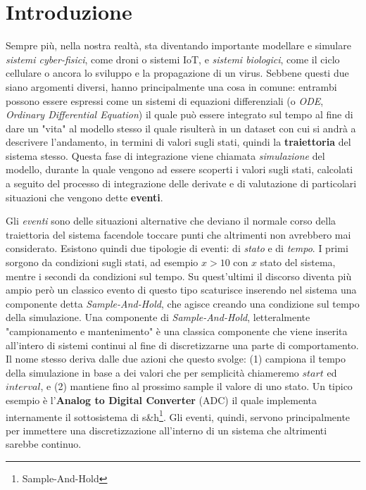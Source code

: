 \chapter{Introduzione}
Sempre più, nella nostra realtà, sta diventando importante modellare e simulare \textit{sistemi cyber-fisici}, come droni o sistemi IoT, e \textit{sistemi biologici}, come il ciclo cellulare o ancora lo sviluppo e la propagazione di un virus. Sebbene questi due siano argomenti diversi, hanno principalmente una cosa in comune: entrambi possono essere espressi come un sistemi di equazioni differenziali (o \textit{ODE}, \textit{Ordinary Differential Equation}) il quale può essere integrato sul tempo al fine di dare un "vita" al modello stesso il quale risulterà in un dataset con cui si andrà a descrivere l'andamento, in termini di valori sugli stati, quindi la \textbf{traiettoria} del sistema stesso. Questa fase di integrazione viene chiamata \textit{simulazione} del modello, durante la quale vengono ad essere scoperti i valori sugli stati, calcolati a seguito del processo di integrazione delle derivate e di valutazione di particolari situazioni che vengono dette \textbf{eventi}.

Gli \textit{eventi} sono delle situazioni alternative che deviano il normale corso della traiettoria del sistema facendole toccare punti che altrimenti non avrebbero mai considerato. Esistono quindi due tipologie di eventi: di \textit{stato} e di \textit{tempo}. I primi sorgono da condizioni sugli stati, ad esempio $x > 10$ con $x$ stato del sistema, mentre i secondi da condizioni sul tempo. Su quest'ultimi il discorso diventa più ampio però un classico evento di questo tipo scaturisce inserendo nel sistema una componente detta \textit{Sample-And-Hold}, che agisce creando una condizione sul tempo della simulazione. Una componente di \textit{Sample-And-Hold}, letteralmente "campionamento e mantenimento" è una classica componente che viene inserita all'intero di sistemi continui al fine di discretizzarne una parte di comportamento. Il nome stesso deriva dalle due azioni che questo svolge: (1) campiona il tempo della simulazione in base a dei valori che per semplicità chiameremo $start$ ed $interval$, e (2) mantiene fino al prossimo sample il valore di uno stato. Un tipico esempio è l'\textbf{Analog to Digital Converter} (ADC) il quale implementa internamente il sottosistema di s\&h\footnote{Sample-And-Hold}. Gli eventi, quindi, servono principalmente per immettere una discretizzazione all'interno di un sistema che altrimenti sarebbe continuo.\\

